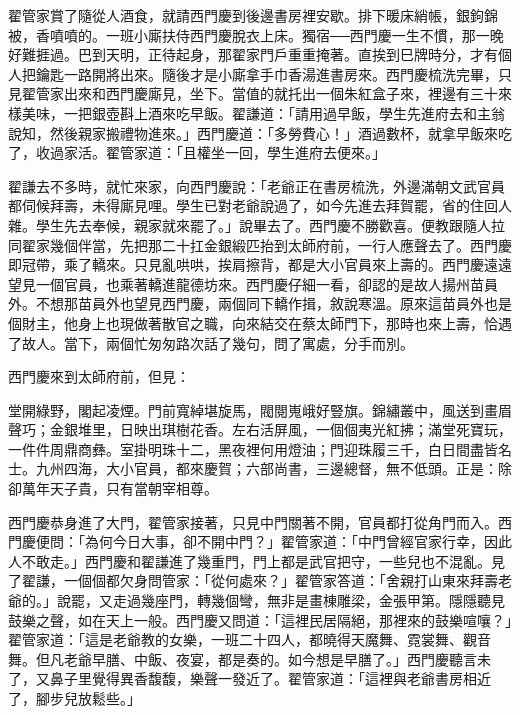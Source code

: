 翟管家賞了隨從人酒食，就請西門慶到後邊書房裡安歇。排下暖床綃帳，銀鉤錦被，香噴噴的。一班小廝扶侍西門慶脫衣上床。獨宿──西門慶一生不慣，那一晚好難捱過。巴到天明，正待起身，那翟家門戶重重掩著。直挨到巳牌時分，才有個人把鑰匙一路開將出來。隨後才是小廝拿手巾香湯進書房來。西門慶梳洗完畢，只見翟管家出來和西門慶廝見，坐下。當值的就托出一個朱紅盒子來，裡邊有三十來樣美味，一把銀壺斟上酒來吃早飯。翟謙道：「請用過早飯，學生先進府去和主翁說知，然後親家搬禮物進來。」西門慶道：「多勞費心！」酒過數杯，就拿早飯來吃了，收過家活。翟管家道：「且權坐一回，學生進府去便來。」

翟謙去不多時，就忙來家，向西門慶說：「老爺正在書房梳洗，外邊滿朝文武官員都伺候拜壽，未得廝見哩。學生已對老爺說過了，如今先進去拜賀罷，省的住回人雜。學生先去奉候，親家就來罷了。」說畢去了。西門慶不勝歡喜。便教跟隨人拉同翟家幾個伴當，先把那二十扛金銀緞匹抬到太師府前，一行人應聲去了。西門慶即冠帶，乘了轎來。只見亂哄哄，挨肩擦背，都是大小官員來上壽的。西門慶遠遠望見一個官員，也乘著轎進龍德坊來。西門慶仔細一看，卻認的是故人揚州苗員外。不想那苗員外也望見西門慶，兩個同下轎作揖，敘說寒溫。原來這苗員外也是個財主，他身上也現做著散官之職，向來結交在蔡太師門下，那時也來上壽，恰遇了故人。當下，兩個忙匆匆路次話了幾句，問了寓處，分手而別。

西門慶來到太師府前，但見：

堂開綠野，閣起凌煙。門前寬綽堪旋馬，閥閱嵬峨好豎旗。錦繡叢中，風送到畫眉聲巧；金銀堆里，日映出琪樹花香。左右活屏風，一個個夷光紅拂；滿堂死寶玩，一件件周鼎商彝。室掛明珠十二，黑夜裡何用燈油；門迎珠履三千，白日間盡皆名士。九州四海，大小官員，都來慶賀；六部尚書，三邊總督，無不低頭。正是：除卻萬年天子貴，只有當朝宰相尊。

西門慶恭身進了大門，翟管家接著，只見中門關著不開，官員都打從角門而入。西門慶便問：「為何今日大事，卻不開中門？」翟管家道：「中門曾經官家行幸，因此人不敢走。」西門慶和翟謙進了幾重門，門上都是武官把守，一些兒也不混亂。見了翟謙，一個個都欠身問管家：「從何處來？」翟管家答道：「舍親打山東來拜壽老爺的。」說罷，又走過幾座門，轉幾個彎，無非是畫棟雕梁，金張甲第。隱隱聽見鼓樂之聲，如在天上一般。西門慶又問道：「這裡民居隔絕，那裡來的鼓樂喧嚷？」翟管家道：「這是老爺教的女樂，一班二十四人，都曉得天魔舞、霓裳舞、觀音舞。但凡老爺早膳、中飯、夜宴，都是奏的。如今想是早膳了。」西門慶聽言未了，又鼻子里覺得異香馥馥，樂聲一發近了。翟管家道：「這裡與老爺書房相近了，腳步兒放鬆些。」

